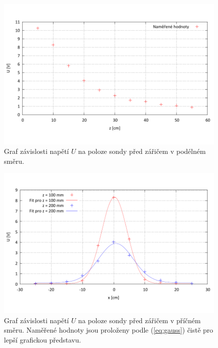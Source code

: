 \documentclass[english]{article}
\begin{document}
	\begin{figure}[h!]
	\begin{center}
	    \vspace*{-1cm}
		\includegraphics[width=\linewidth]{../gnuplot/2_mapping_podel.pdf}
	    \vspace*{-2cm}
		\caption{Graf závislosti napětí $U$ na poloze sondy před zářičem v podélném směru. }
		\label{fig:g_mapping_podel}
	\end{center}
	\end{figure}			
	
	\begin{figure}[h!]
	\begin{center}
	    \vspace*{-1cm}
		\includegraphics[width=\linewidth]{../gnuplot/2_mapping_pric.pdf}
	    \vspace*{-2cm}
		\caption{Graf závislosti napětí $U$ na poloze sondy před zářičem v příčném směru. Naměřené hodnoty jsou proloženy podle (\ref{eq:gauss}) čistě pro lepší grafickou představu. }
		\label{fig:g_mapping_pric}
	\end{center}
	\end{figure}		
	
\end{document}
